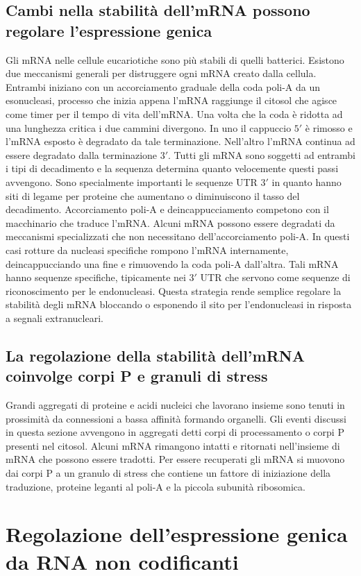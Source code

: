 \subsection{Cambi nella stabilit\`a dell'mRNA possono regolare l'espressione genica}
Gli mRNA nelle cellule eucariotiche sono pi\`u stabili di quelli batterici. Esistono due meccanismi generali per distruggere ogni mRNA creato dalla cellula. Entrambi iniziano con un
accorciamento graduale della coda poli-A da un esonucleasi, processo che inizia appena l'mRNA raggiunge il citosol che agisce come timer per il tempo di vita dell'mRNA. Una volta che 
la coda \`e ridotta ad una lunghezza critica i due cammini divergono. In uno il cappuccio $5'$ \`e rimosso e l'mRNA esposto \`e degradato da tale terminazione. Nell'altro l'mRNA continua
ad essere degradato dalla terminazione $3'$. Tutti gli mRNA sono soggetti ad entrambi i tipi di decadimento e la sequenza determina quanto velocemente questi passi avvengono. Sono 
specialmente importanti le sequenze UTR $3'$ in quanto hanno siti di legame per proteine che aumentano o diminuiscono il tasso del decadimento. Accorciamento poli-A e deincappucciamento
competono con il macchinario che traduce l'mRNA. Alcuni mRNA possono essere degradati da meccanismi specializzati che non necessitano dell'accorciamento poli-A. In questi casi 
rotture da nucleasi specifiche rompono l'mRNA internamente, deincappucciando una fine e rimuovendo la coda poli-A dall'altra. Tali mRNA hanno sequenze specifiche, tipicamente nei $3'$
UTR che servono come sequenze di riconoscimento per le endonucleasi. Questa strategia rende semplice regolare la stabilit\`a degli mRNA bloccando o esponendo il sito per l'endonucleasi
in risposta a segnali extranucleari. 
\subsection{La regolazione della stabilit\`a dell'mRNA coinvolge corpi P e granuli di stress}
Grandi aggregati di proteine e acidi nucleici che lavorano insieme sono tenuti in prossimit\`a da connessioni a bassa affinit\`a formando organelli. Gli eventi discussi in questa sezione
avvengono in aggregati detti corpi di processamento o corpi P presenti nel citosol. Alcuni mRNA rimangono intatti e ritornati nell'insieme di mRNA che possono essere tradotti. Per
essere recuperati gli mRNA si muovono dai corpi P a un granulo di stress che contiene un fattore di iniziazione della traduzione, proteine leganti al poli-A e la piccola subunit\`a
ribosomica.
\section{Regolazione dell'espressione genica da RNA non codificanti}
